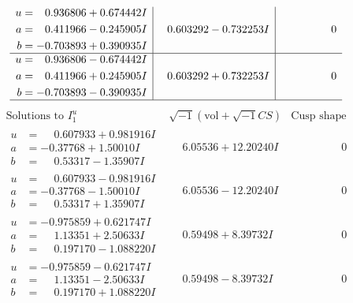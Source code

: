 \documentclass[1p]{elsarticle_modified}
\theoremstyle{definition}
\newcommand{\I}{\sqrt{-1}}
\begin{document}
$$\begin{array}{c|c|c}
\begin{aligned}
u &= \phantom{-}0.936806 + 0.674442 I \\
a &= \phantom{-}0.411966 - 0.245905 I \\
b &= -0.703893 + 0.390935 I\end{aligned}
 & \phantom{-}0.603292 - 0.732253 I & \phantom{-0.000000 } 0 \\ \hline\begin{aligned}
u &= \phantom{-}0.936806 - 0.674442 I \\
a &= \phantom{-}0.411966 + 0.245905 I \\
b &= -0.703893 - 0.390935 I\end{aligned}
 & \phantom{-}0.603292 + 0.732253 I & \phantom{-0.000000 } 0\\
 \hline 
 \end{array}$$\newpage$$\begin{array}{c|c|c}  
\text{Solutions to }I^u_{1}& \I (\text{vol} + \sqrt{-1}CS) & \text{Cusp shape}\\
 \hline 
\begin{aligned}
u &= \phantom{-}0.607933 + 0.981916 I \\
a &= -0.37768 + 1.50010 I \\
b &= \phantom{-}0.53317 - 1.35907 I\end{aligned}
 & \phantom{-}6.05536 + 12.20240 I & \phantom{-0.000000 } 0 \\ \hline\begin{aligned}
u &= \phantom{-}0.607933 - 0.981916 I \\
a &= -0.37768 - 1.50010 I \\
b &= \phantom{-}0.53317 + 1.35907 I\end{aligned}
 & \phantom{-}6.05536 - 12.20240 I & \phantom{-0.000000 } 0 \\ \hline\begin{aligned}
u &= -0.975859 + 0.621747 I \\
a &= \phantom{-}1.13351 + 2.50633 I \\
b &= \phantom{-}0.197170 - 1.088220 I\end{aligned}
 & \phantom{-}0.59498 + 8.39732 I & \phantom{-0.000000 } 0 \\ \hline\begin{aligned}
u &= -0.975859 - 0.621747 I \\
a &= \phantom{-}1.13351 - 2.50633 I \\
b &= \phantom{-}0.197170 + 1.088220 I\end{aligned}
 & \phantom{-}0.59498 - 8.39732 I & \phantom{-0.000000 } 0 \\ \hline\begin{aligned}

\end{aligned}
\end{array}$$
\end{document}

